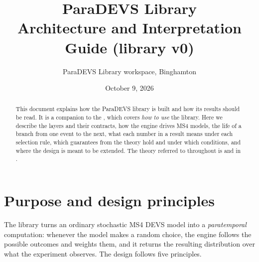 \documentclass[11pt]{article}
\title{\textbf{ParaDEVS Library}\\[4pt]\large Architecture and Interpretation Guide (library v0)}
\author{ParaDEVS Library workspace, Binghamton}
\date{October 9, 2026}
\begin{document}
\maketitle

\begin{abstract}
\noindent This document explains how the ParaDEVS library is built and how its results should be read. It is a
companion to the , which covers \emph{how to use} the library. Here we describe
the layers and their contracts, how the engine drives MS4 models, the life of a branch from one event to the next,
what each number in a result means under each selection rule, which guarantees from the theory hold and under which
conditions, and where the design is meant to be extended. The theory referred to throughout is
 and  in .
\end{abstract}

\relateddocs

\tableofcontents
\newpage

\section{Purpose and design principles}

The library turns an ordinary stochastic MS4 DEVS model into a \emph{paratemporal} computation: whenever the model
makes a random choice, the engine follows the possible outcomes and weights them, and it returns the resulting
distribution over what the experiment observes. The design follows five principles.
\end{document}
